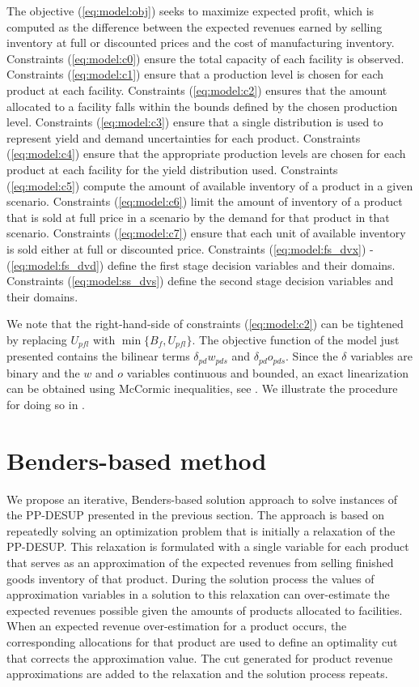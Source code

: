 \documentclass[12pt]{article}
\theoremstyle{thmstylethree}%
\begin{document}
The objective (\ref{eq:model:obj}) seeks to maximize expected profit, which is computed as the difference between the expected revenues earned by selling inventory at full or discounted prices and the cost of manufacturing inventory. Constraints (\ref{eq:model:c0}) ensure the total capacity of each facility is observed. Constraints (\ref{eq:model:c1}) ensure that a production level is chosen for each product at each facility. Constraints (\ref{eq:model:c2}) ensures that the amount allocated to a facility falls within the bounds defined by the chosen production level. Constraints (\ref{eq:model:c3}) ensure that a single distribution is used to represent yield and demand uncertainties for each product. Constraints (\ref{eq:model:c4}) ensure that the appropriate production levels are chosen for each product at each facility for the yield distribution used. Constraints (\ref{eq:model:c5}) compute the amount of available inventory of a product in a given scenario. Constraints (\ref{eq:model:c6}) limit the amount of inventory of a product that is sold at full price in a scenario by the demand for that product in that scenario. Constraints (\ref{eq:model:c7}) ensure that each unit of available inventory is sold either at full or discounted price. Constraints (\ref{eq:model:fs_dvx}) - (\ref{eq:model:fs_dvd}) define the first stage decision variables and their domains. Constraints (\ref{eq:model:ss_dvs}) define the second stage decision variables and their domains. 



We note that the right-hand-side of constraints (\ref{eq:model:c2}) can be tightened by replacing $U_{pfl}$ with $\min\{B_{f},U_{pfl}\}.$ 
The objective function of the model just presented contains the bilinear terms $\delta_{pd}w_{pds}$ and $\delta_{pd}o_{pds}.$ Since the $\delta$ variables are binary and the $w$ and $o$ variables continuous and bounded, an exact linearization can be obtained using McCormic inequalities, see \cite{Mcc76,AlkF83}. We illustrate the procedure for doing so in .




\section{Benders-based method}
\label{sec:benders}
We propose an iterative, Benders-based solution approach to solve instances of the PP-DESUP presented in the previous section. The approach is based on repeatedly solving an optimization problem that is initially a relaxation of the PP-DESUP. This relaxation is formulated with a single variable for each product that serves as an approximation of the expected revenues from selling finished goods inventory of that product. During the solution process the values of approximation variables in a solution to this relaxation can over-estimate the expected revenues possible given the amounts of products allocated to facilities. When an expected revenue over-estimation for a product occurs, the corresponding allocations for that product are used to define an optimality cut that corrects the approximation value. The cut generated for product revenue approximations are added to the relaxation and the solution process repeats. 
\end{document}
